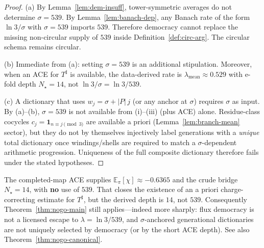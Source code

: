 \begin{proof}
(a) By Lemma~\ref{lem:dem-insuff}, tower-symmetric averages do not determine
\(\sigma=539\). By Lemma~\ref{lem:banach-dep}, any Banach rate of the form
\(\ln 3/\sigma\) with \(\sigma=539\) imports \(539\). Therefore democracy
cannot replace the missing non-circular supply of \(539\) inside
Definition~\ref{def:circ-arg}. The circular schema remains circular.

(b) Immediate from (a): setting \(\sigma=539\) is an additional stipulation.
Moreover, when an ACE for \(T^\sharp\) is available, the data-derived rate is
\(\lambda_{\mathrm{mean}}\approx 0.529\) with e-fold depth \(N_\star=14\), not
\(\ln 3/\sigma=\ln 3/539\).

(c) A dictionary that uses \(w_j=\sigma+ |P|\,j\) (or any anchor at \(\sigma\))
requires \(\sigma\) as input. By (a)--(b), \(\sigma=539\) is not available from
(i)--(iii) (plus ACE) alone. Residue-class cocycles \(c_j=\mathbf{1}_{n\equiv j\pmod{3}}\)
are available a priori (Lemma~\ref{lem:branch-mean} sector), but they do not
by themselves injectively label generations with a \emph{unique} total
dictionary once windings/shells are required to match a \(\sigma\)-dependent
arithmetic progression. Uniqueness of the full composite dictionary therefore
fails under the stated hypotheses.
\end{proof}

\begin{corollary}[ACE strengthens the no-go for \(\sigma=539\)]
\label{cor:published}
The completed-map ACE supplies
\(\mathbb{E}_\pi[\chi]\approx -0.6365\) and the crude bridge \(N_\star=14\), with
\textbf{no} use of \(539\). That closes the existence of an a priori
charge-correcting estimate for \(T^\sharp\), but the derived depth is \(14\),
not \(539\). Consequently Theorem~\ref{thm:nogo-main} still applies---indeed
more sharply: flux democracy is not a licensed escape to
\(\lambda=\ln 3/539\), and \(\sigma\)-anchored generational dictionaries are
not uniquely selected by democracy (or by the short ACE depth).
See also Theorem~\ref{thm:nogo-canonical}.
\end{corollary}

